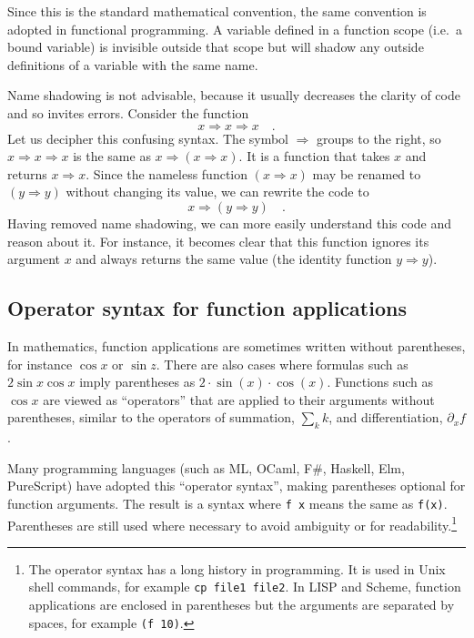 Since this is the standard mathematical convention, the same convention
is adopted in functional programming. A variable defined in a function
scope (i.e.\ a bound variable) is invisible outside that scope but
will shadow any outside definitions of a variable with the same name.

Name shadowing is not advisable, because it
usually decreases the clarity of code and so invites errors. Consider
the function
\[
x\Rightarrow x\Rightarrow x\quad.
\]
Let us decipher this confusing syntax. The symbol $\Rightarrow$ groups
to the right, so $x\Rightarrow x\Rightarrow x$ is the same as $x\Rightarrow\left(x\Rightarrow x\right)$.
It is a function that takes $x$ and returns $x\Rightarrow x$. Since
the nameless function $\left(x\Rightarrow x\right)$ may be renamed
to $\left(y\Rightarrow y\right)$ without changing its value, we can
rewrite the code to
\[
x\Rightarrow\left(y\Rightarrow y\right)\quad.
\]
Having removed name shadowing, we can more easily understand this
code and reason about it. For instance, it becomes clear that this
function ignores its argument $x$ and always returns the same value
(the identity function $y\Rightarrow y$).

\subsection{Operator syntax for function applications}

In mathematics, function applications are sometimes written without
parentheses, for instance $\cos x$ or $\sin z$. There are also cases
where formulas such as $2\sin x\cos x$ imply parentheses as $2\cdot\sin\left(x\right)\cdot\cos\left(x\right)$.
Functions such as $\cos x$ are viewed as ``operators'' that are
applied to their arguments without parentheses, similar to the operators
of summation, $\sum_{k}k$, and differentiation, $\partial_{x}f$.

Many programming languages (such as ML, OCaml, F\#, Haskell, Elm,
PureScript) have adopted this ``operator syntax'',
making parentheses optional for function arguments. The result is
a syntax where \lstinline!f x! means the same as \lstinline!f(x)!.
Parentheses are still used where necessary to avoid ambiguity or for
readability.\footnote{The operator syntax has a long history in programming. It is used
in Unix shell commands, for example \lstinline!cp file1 file2!. In
LISP and Scheme, function applications are enclosed in parentheses
but the arguments are separated by spaces, for example \lstinline!(f 10)!.}

